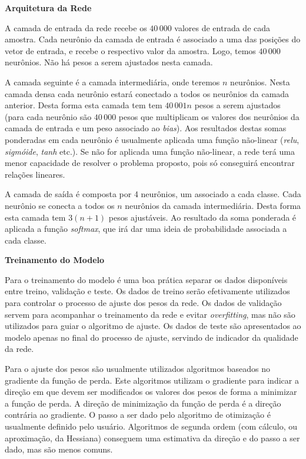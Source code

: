 \documentclass[final,3p]{elsarticle}
\numberwithin{equation}{section}
\begin{document}
        \noindent \textbf{Arquitetura da Rede}

        A camada de entrada da rede recebe os $40\,000$ valores de entrada de cada amostra. Cada neurônio da camada de entrada é associado a uma das posições do vetor de entrada, e recebe o respectivo valor da amostra. Logo, temos $40\,000$ neurônios. Não há pesos a serem ajustados nesta camada.

        A camada seguinte é a camada intermediária, onde teremos $n$ neurônios. Nesta camada densa cada neurônio estará conectado a todos os neurônios da camada anterior. Desta forma esta camada tem tem $40\,001n$ pesos a serem ajustados (para cada neurônio são $40\,000$ pesos que multiplicam os valores dos neurônios da camada de entrada e um peso associado ao \emph{bias}). Aos resultados destas somas ponderadas em cada neurônio é usualmente aplicada uma função não-linear (\emph{relu}, \emph{sigmóide}, \emph{tanh} etc.). Se não for aplicada uma função não-linear, a rede terá uma menor capacidade de resolver o problema proposto, pois só conseguirá encontrar relações lineares.

        A camada de saída é composta por 4 neurônios, um associado a cada classe. Cada neurônio se conecta a todos os $n$ neurônios da camada intermediária. Desta forma esta camada tem $3 (n+1)$ pesos ajustáveis. Ao resultado da soma ponderada é aplicada a função \emph{softmax}, que irá dar uma ideia de probabilidade associada a cada classe.

        \noindent \textbf{Treinamento do Modelo}

        Para o treinamento do modelo é uma boa prática separar os dados disponíveis entre treino, validação e teste. Os dados de treino serão efetivamente utilizados para controlar o processo de ajuste dos pesos da rede. Os dados de validação servem para acompanhar o treinamento da rede e evitar \emph{overfitting}, mas não são utilizados para guiar o algoritmo de ajuste. Os dados de teste são apresentados ao modelo apenas no final do processo de ajuste, servindo de indicador da qualidade da rede.

        Para o ajuste dos pesos são usualmente utilizados algoritmos baseados no gradiente da função de perda. Este algoritmos utilizam o gradiente para indicar a direção em que devem ser modificados os valores dos pesos de forma a minimizar a função de perda. A direção de minimização da função de perda é a direção contrária ao gradiente. O passo a ser dado pelo algoritmo de otimização é usualmente definido pelo usuário. Algoritmos de segunda ordem (com cálculo, ou aproximação, da Hessiana) conseguem uma estimativa da direção e do passo a ser dado, mas são menos comuns.
\end{document}
